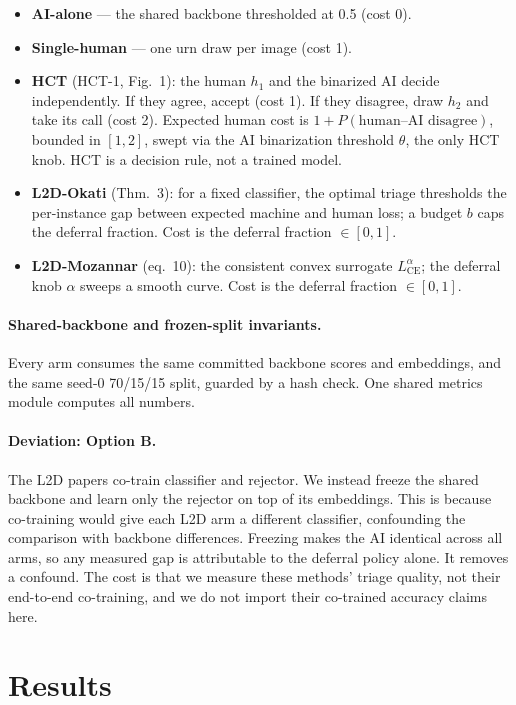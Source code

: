 \documentclass[10pt]{article}
\begin{document}
\begin{itemize}
  \item \textbf{AI-alone} --- the shared backbone thresholded at 0.5 (cost 0).
  \item \textbf{Single-human} --- one urn draw per image (cost 1).
  \item \textbf{HCT} (HCT-1, Fig.~1): the human $h_1$ and the binarized AI decide independently. If
    they agree, accept (cost 1). If they disagree, draw $h_2$ and take its call (cost 2). Expected
    human cost is $1 + P(\text{human--AI disagree})$, bounded in $[1,2]$, swept via the AI
    binarization threshold $\theta$, the only HCT knob. HCT is a decision rule, not a trained model.
  \item \textbf{L2D-Okati} (Thm.~3): for a fixed classifier, the optimal triage thresholds the
    per-instance gap between expected machine and human loss; a budget $b$ caps the deferral
    fraction. Cost is the deferral fraction $\in [0,1]$.
  \item \textbf{L2D-Mozannar} (eq.~10): the consistent convex surrogate $L_{\mathrm{CE}}^{\alpha}$;
    the deferral knob $\alpha$ sweeps a smooth curve. Cost is the deferral fraction $\in [0,1]$.
\end{itemize}

\paragraph{Shared-backbone and frozen-split invariants.}
Every arm consumes the same committed backbone scores and embeddings, and the same seed-0 70/15/15
split, guarded by a hash check. One shared metrics module computes all numbers.

\paragraph{Deviation: Option B.}
The L2D papers co-train classifier and rejector. We instead freeze the shared backbone and learn
only the rejector on top of its embeddings. This is because co-training would give each L2D arm
a different classifier, confounding the comparison with backbone differences. Freezing makes the AI
identical across all arms, so any measured gap is attributable to the deferral policy alone. It
removes a confound. The cost is that we measure these methods' triage quality, not their end-to-end
co-training, and we do not import their co-trained accuracy claims here.

\section{Results}
\end{document}
